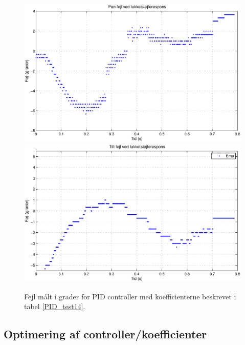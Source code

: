 \begin{figure}
\includegraphics[width=1\textwidth]{./graphics/error_pan.eps}
\includegraphics[width=1\textwidth]{./graphics/error_tilt.eps}
\caption[PID controller koefficienter]{Fejl målt i grader for PID controller med koefficienterne beskrevet i tabel \ref{PID_test14}.} \label{PID_test14_plot}
\end{figure}

\subsection{Optimering af controller/koefficienter}
